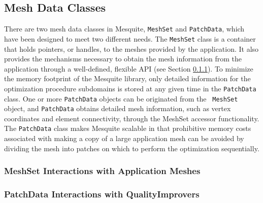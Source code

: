 \documentclass[psfig]{article}
\begin{document}

\subsection{Mesh Data Classes} \label{sec:MeshData}

There are two mesh data classes in Mesquite, \texttt{MeshSet} and
\texttt{PatchData}, which have been designed to meet two different
needs.  The {\tt MeshSet} class is a container that holds pointers, or
handles, to the meshes provided by the application.  It also provides
the mechanisms necessary to obtain the mesh information from the
application through a well-defined, flexible API (see Section
\ref{sec:meshset}).  To minimize the memory footprint of the Mesquite
library, only detailed information for the optimization procedure
subdomains is stored at any given time in the {\tt PatchData} class.
One or more {\tt PatchData} objects can be originated from the {\tt
MeshSet} object, and {\tt PatchData} obtains detailed mesh
information, such as vertex coordinates and element connectivity,
through the MeshSet accessor functionality.  The \texttt{PatchData}
class makes Mesquite scalable in that prohibitive memory costs
associated with making a copy of a large application mesh can be
avoided by dividing the mesh into patches on which to perform the
optimization sequentially.

\subsubsection{MeshSet Interactions with Application Meshes}
\label{sec:meshset}

\subsubsection{PatchData Interactions with QualityImprovers}
\end{document}
